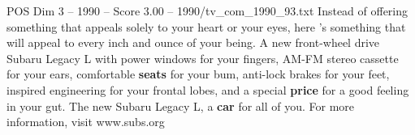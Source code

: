 \begin{textsample}{POS Dim 3 – 1990 – Score 3.00 – 1990/tv\_com\_1990\_93.txt}  \label{ex:f3_pos_071}
Instead of offering something that appeals solely to your heart or your eyes, here 's something that will appeal to every inch and ounce of your being.
A new front-wheel drive Subaru Legacy L with power windows for your fingers, AM-FM stereo cassette for your ears, comfortable \textbf{seats} for your bum, anti-lock brakes for your feet, inspired engineering for your frontal lobes, and a special \textbf{price} for a good feeling in your gut.
The new Subaru Legacy L, a \textbf{car} for all of you.
For more information, visit www.subs.org

\end{textsample}
